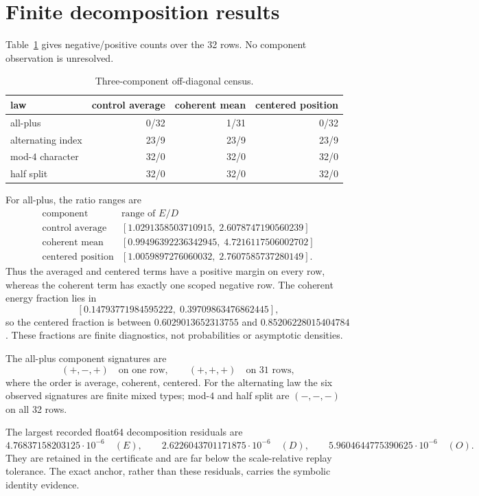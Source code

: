 \documentclass[10pt]{article}
\begin{document}
\section{Finite decomposition results}

Table~\ref{tab:decomp} gives negative/positive counts over the 32 rows.  No
component observation is unresolved.

\begin{table}[ht]
\centering
\caption{Three-component off-diagonal census.}
\label{tab:decomp}
\small
\begin{tabular}{lrrr}
\toprule
law & control average & coherent mean & centered position\\
\midrule
all-plus & 0/32 & 1/31 & 0/32\\
alternating index & 23/9 & 23/9 & 23/9\\
mod-$4$ character & 32/0 & 32/0 & 32/0\\
half split & 32/0 & 32/0 & 32/0\\
\bottomrule
\end{tabular}
\end{table}

For all-plus, the ratio ranges are
\[
\begin{array}{c|c}
\text{component}&\text{range of }E/D\\ \hline
\text{control average}&[1.0291358503710915,\;2.6078747190560239]\\
\text{coherent mean}&[0.99496392236342945,\;4.7216117506002702]\\
\text{centered position}&[1.0059897276060032,\;2.7607585737280149].
\end{array}
\]
Thus the averaged and centered terms have a positive margin on every row,
whereas the coherent term has exactly one scoped negative row.  The coherent
energy fraction lies in
\[
 [0.14793771984595222,\;0.39709863476862445],
\]
so the centered fraction is between $0.6029013652313755$ and
$0.85206228015404784$.  These fractions are finite diagnostics, not
probabilities or asymptotic densities.

The all-plus component signatures are
\[
 (+,-,+)\quad\text{on one row},\qquad
 (+,+,+)\quad\text{on 31 rows},
\]
where the order is average, coherent, centered.  For the alternating law the
six observed signatures are finite mixed types; mod-$4$ and half split are
$( -,-,-)$ on all 32 rows.

The largest recorded float64 decomposition residuals are
\[
4.76837158203125\cdot10^{-6}\quad(E),\qquad
2.6226043701171875\cdot10^{-6}\quad(D),\qquad
5.9604644775390625\cdot10^{-6}\quad(O).
\]
They are retained in the certificate and are far below the scale-relative
replay tolerance.  The exact anchor, rather than these residuals, carries the
symbolic identity evidence.
\end{document}
